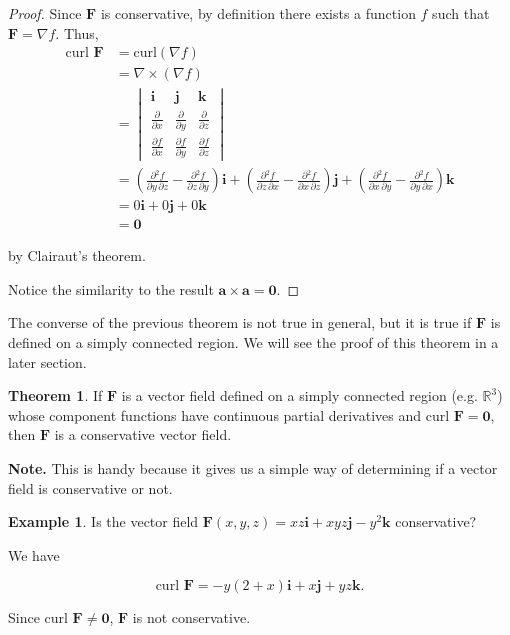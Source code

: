 \documentclass[11pt,oneside,english]{amsart}
\theoremstyle{definition}
\newtheorem{theorem}{Theorem}
\newtheorem*{example}{Example}
\newcommand{\R}{\mathbb{R}}
\newcommand{\pp}[2]{\frac{\partial{#1}}{\partial{#2}}}
\begin{document}
\begin{proof}

Since $\mathbf{F}$ is conservative, by definition there exists a function $f$ such that $\mathbf{F}=\nabla f$. Thus,
\begin{align*}
\text{curl }\mathbf{F}&=\text{curl}(\nabla f)\\[2mm]
&=\nabla \times (\nabla f)\\[2mm]
&=\begin{vmatrix}\mathbf{i} & \mathbf{j} & \mathbf{k}\\\pp{}{x} & \pp{}{y} & \pp{}{z}\\ \pp{f}{x} & \pp{f}{y} & \pp{f}{z}\end{vmatrix}\\[2mm]
&=\left(\pp{^2f}{y\,\partial z}-\pp{^2f}{z\,\partial y}\right)\mathbf{i}+\left(\pp{^2f}{z\,\partial x}-\pp{^2f}{x\,\partial z}\right)\mathbf{j}+\left(\pp{^2f}{x\,\partial y}-\pp{^2f}{y\,\partial x}\right)\mathbf{k}\\[2mm]
&=0\mathbf{i}+0\mathbf{j}+0\mathbf{k}\\[2mm]
&=\mathbf{0}
\end{align*}

by Clairaut's theorem.

Notice the similarity to the result $\mathbf{a}\times \mathbf{a}=\mathbf{0}$.
\end{proof}






The converse of the previous theorem is not true in general, but it is true if $\mathbf{F}$ is defined on a simply connected region. We will see the proof of this theorem in a later section.

\begin{theorem}
If $\mathbf{F}$ is a vector field defined on a simply connected region (e.g. $\R^3$) whose component functions have continuous partial derivatives and curl $\mathbf{F}=\mathbf{0}$, then $\mathbf{F}$ is a conservative vector field.
\end{theorem}

\textbf{Note.} This is handy because it gives us a simple way of determining if a vector field is conservative or not.

\begin{example}
Is the vector field $\mathbf{F}(x,y,z)=xz\mathbf{i}+xyz\mathbf{j}-y^2\mathbf{k}$ conservative?

We have

\[
\text{curl }\mathbf{F}=-y(2+x)\mathbf{i}+x\mathbf{j}+yz\mathbf{k}.
\]

Since curl $\mathbf{F}\neq\mathbf{0}$, $\mathbf{F}$ is not conservative.

\end{example}
\end{document}
